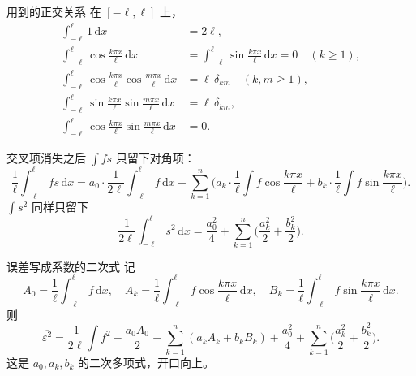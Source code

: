 \documentclass[fontset=windows, chinese, 10pt, xcolor=dvipsnames]{beamer}
\begin{document}
\begin{frame}{用到的正交关系}
  在 $[-\ell,\ell]$ 上，
  \begin{align*}
    \int_{-\ell}^{\ell} 1\,\mathrm{d}x&=2\ell,\\
    \int_{-\ell}^{\ell}\cos\frac{k\pi x}{\ell}\,\mathrm{d}x
    &=\int_{-\ell}^{\ell}\sin\frac{k\pi x}{\ell}\,\mathrm{d}x=0
    \quad(k\geq 1),\\
    \int_{-\ell}^{\ell}\cos\frac{k\pi x}{\ell}\cos\frac{m\pi x}{\ell}\,\mathrm{d}x
    &=\ell\,\delta_{km}
    \quad(k,m\geq 1),\\
    \int_{-\ell}^{\ell}\sin\frac{k\pi x}{\ell}\sin\frac{m\pi x}{\ell}\,\mathrm{d}x
    &=\ell\,\delta_{km},\\
    \int_{-\ell}^{\ell}\cos\frac{k\pi x}{\ell}\sin\frac{m\pi x}{\ell}\,\mathrm{d}x
    &=0.
  \end{align*}
\end{frame}

\begin{frame}{交叉项消失之后}
  $\displaystyle\int f s$ 只留下对角项：
  \begin{equation*}
    \frac{1}{\ell}\int_{-\ell}^{\ell} f s\,\mathrm{d}x
    =a_0\cdot\frac{1}{2\ell}\int_{-\ell}^{\ell} f\,\mathrm{d}x
     +\sum_{k=1}^{n}
       \Biggl(
         a_k\cdot\frac{1}{\ell}\int f\cos\frac{k\pi x}{\ell}
         +b_k\cdot\frac{1}{\ell}\int f\sin\frac{k\pi x}{\ell}
       \Biggr).
  \end{equation*}
  $\displaystyle\int s^2$ 同样只留下
  \begin{equation*}
    \frac{1}{2\ell}\int_{-\ell}^{\ell} s^2\,\mathrm{d}x
    =\frac{a_0^2}{4}
     +\sum_{k=1}^{n}\Biggl(\frac{a_k^2}{2}+\frac{b_k^2}{2}\Biggr).
  \end{equation*}
\end{frame}

\begin{frame}{误差写成系数的二次式}
  记
  \begin{equation*}
    A_0=\frac{1}{\ell}\int_{-\ell}^{\ell} f\,\mathrm{d}x,\quad
    A_k=\frac{1}{\ell}\int_{-\ell}^{\ell} f\cos\frac{k\pi x}{\ell}\,\mathrm{d}x,\quad
    B_k=\frac{1}{\ell}\int_{-\ell}^{\ell} f\sin\frac{k\pi x}{\ell}\,\mathrm{d}x.
  \end{equation*}
  则
  \begin{equation*}
    \overline{\varepsilon^2}
    =\frac{1}{2\ell}\int f^2
     -\frac{a_0 A_0}{2}
     -\sum_{k=1}^{n}(a_k A_k+b_k B_k)
     +\frac{a_0^2}{4}
     +\sum_{k=1}^{n}\Biggl(\frac{a_k^2}{2}+\frac{b_k^2}{2}\Biggr).
  \end{equation*}
  这是 $a_0,a_k,b_k$ 的二次多项式，开口向上。
\end{frame}
\end{document}
